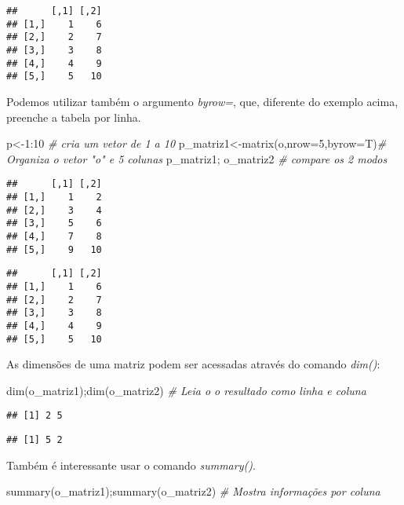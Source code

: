 \documentclass[
]{book}
\newenvironment{Shaded}{\begin{snugshade}}{\end{snugshade}}
\newcommand{\AttributeTok}[1]{\textcolor[rgb]{0.77,0.63,0.00}{#1}}
\newcommand{\CommentTok}[1]{\textcolor[rgb]{0.56,0.35,0.01}{\textit{#1}}}
\newcommand{\DecValTok}[1]{\textcolor[rgb]{0.00,0.00,0.81}{#1}}
\newcommand{\FunctionTok}[1]{\textcolor[rgb]{0.00,0.00,0.00}{#1}}
\newcommand{\NormalTok}[1]{#1}
\newcommand{\OtherTok}[1]{\textcolor[rgb]{0.56,0.35,0.01}{#1}}
\newcommand{\SpecialCharTok}[1]{\textcolor[rgb]{0.00,0.00,0.00}{#1}}
\begin{document}
\begin{verbatim}
##      [,1] [,2]
## [1,]    1    6
## [2,]    2    7
## [3,]    3    8
## [4,]    4    9
## [5,]    5   10
\end{verbatim}

Podemos utilizar também o argumento \emph{byrow=}, que, diferente do exemplo acima, preenche a tabela por linha.

\begin{Shaded}
\begin{Highlighting}[]
\NormalTok{p}\OtherTok{\textless{}{-}}\DecValTok{1}\SpecialCharTok{:}\DecValTok{10} \CommentTok{\# cria um vetor de 1 a 10}
\NormalTok{p\_matriz1}\OtherTok{\textless{}{-}}\FunctionTok{matrix}\NormalTok{(o,}\AttributeTok{nrow=}\DecValTok{5}\NormalTok{,}\AttributeTok{byrow=}\NormalTok{T)}\CommentTok{\# Organiza o vetor "o" e 5 colunas}
\NormalTok{p\_matriz1; o\_matriz2 }\CommentTok{\# compare os 2 modos}
\end{Highlighting}
\end{Shaded}

\begin{verbatim}
##      [,1] [,2]
## [1,]    1    2
## [2,]    3    4
## [3,]    5    6
## [4,]    7    8
## [5,]    9   10
\end{verbatim}

\begin{verbatim}
##      [,1] [,2]
## [1,]    1    6
## [2,]    2    7
## [3,]    3    8
## [4,]    4    9
## [5,]    5   10
\end{verbatim}

As dimensões de uma matriz podem ser acessadas através do comando \emph{dim()}:

\begin{Shaded}
\begin{Highlighting}[]
\FunctionTok{dim}\NormalTok{(o\_matriz1);}\FunctionTok{dim}\NormalTok{(o\_matriz2) }\CommentTok{\# Leia o o resultado como linha e coluna}
\end{Highlighting}
\end{Shaded}

\begin{verbatim}
## [1] 2 5
\end{verbatim}

\begin{verbatim}
## [1] 5 2
\end{verbatim}

Também é interessante usar o comando \emph{summary()}.

\begin{Shaded}
\begin{Highlighting}[]
\FunctionTok{summary}\NormalTok{(o\_matriz1);}\FunctionTok{summary}\NormalTok{(o\_matriz2) }\CommentTok{\# Mostra informações por coluna}
\end{Highlighting}
\end{Shaded}
\end{document}
